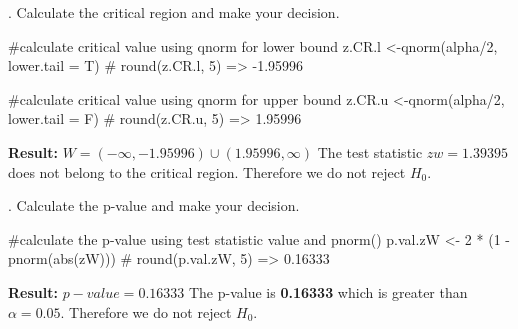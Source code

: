\documentclass[12pt, oneside]{report}\usepackage[]{graphicx}\usepackage[]{color}
\begin{document}
. Calculate the critical region and make your decision.
\begin{Schunk}
\begin{Sinput}
#calculate critical value using qnorm for lower bound
z.CR.l <-qnorm(alpha/2, lower.tail = T)
# round(z.CR.l, 5) => -1.95996

#calculate critical value using qnorm for upper bound
z.CR.u <-qnorm(alpha/2, lower.tail = F)
# round(z.CR.u, 5) => 1.95996
\end{Sinput}
\end{Schunk}
{\bf Result:} $W = (-\infty, -1.95996) \cup (1.95996, \infty) $ \newline
The test statistic $zw = 1.39395$ does not belong to the critical region. Therefore we do not reject $H_0$. \newline

. Calculate the p-value and make your decision.
\begin{Schunk}
\begin{Sinput}
#calculate the p-value using test statistic value and pnorm()
p.val.zW <- 2 * (1 - pnorm(abs(zW)))
# round(p.val.zW, 5) => 0.16333
\end{Sinput}
\end{Schunk}
{\bf Result:} $p-value = 0.16333$ \newline
The p-value is {\bf 0.16333} which is greater than $\alpha = 0.05$. Therefore we do not reject $H_0$. \newline
\end{document}
